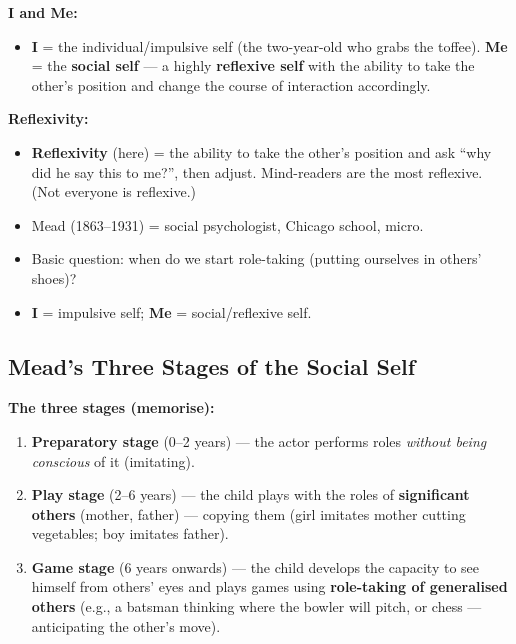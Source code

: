 \begin{KeyConcept}
\textbf{I and Me:}
\begin{itemize}
\item \textbf{I} = the individual/impulsive self (the two-year-old who grabs the toffee). \textbf{Me} = the \textbf{social self} --- a highly \textbf{reflexive self} with the ability to take the other's position and change the course of interaction accordingly.
\end{itemize}
\end{KeyConcept}

\begin{CriticalPoint}
\textbf{Reflexivity:}
\begin{itemize}
\item \textbf{Reflexivity} (here) = the ability to take the other's position and ask ``why did he say this to me?'', then adjust. Mind-readers are the most reflexive. (Not everyone is reflexive.)
\end{itemize}
\end{CriticalPoint}

\begin{QuickRevision}
\begin{itemize}
\item Mead (1863--1931) = social psychologist, Chicago school, micro.
\item Basic question: when do we start role-taking (putting ourselves in others' shoes)?
\item \textbf{I} = impulsive self; \textbf{Me} = social/reflexive self.
\end{itemize}
\end{QuickRevision}

\sectiondivider

\subsection{Mead's Three Stages of the Social Self}

\begin{DataFact}
\textbf{The three stages (memorise):}
\begin{enumerate}
\item \textbf{Preparatory stage} (0--2 years) --- the actor performs roles \textit{without being conscious} of it (imitating).
\item \textbf{Play stage} (2--6 years) --- the child plays with the roles of \textbf{significant others} (mother, father) --- copying them (girl imitates mother cutting vegetables; boy imitates father).
\item \textbf{Game stage} (6 years onwards) --- the child develops the capacity to see himself from others' eyes and plays games using \textbf{role-taking of generalised others} (e.g., a batsman thinking where the bowler will pitch, or chess --- anticipating the other's move).
\end{enumerate}
\end{DataFact}

